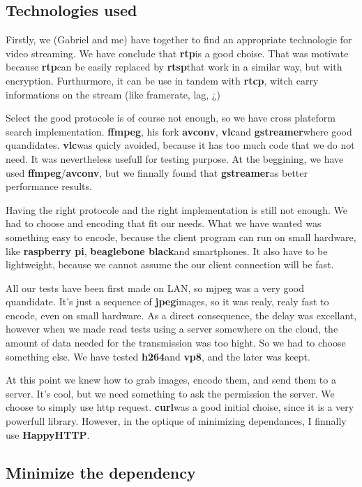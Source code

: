 \documentclass[a4paper,11pt]{custom}
\newcommand{\rtp}{\textbf{rtp}}
\newcommand{\rtcp}{\textbf{rtcp}}
\newcommand{\rtsp}{\textbf{rtsp}}
\newcommand{\vlc}{\textbf{vlc}}
\newcommand{\avconv}{\textbf{avconv}}
\newcommand{\ffmpeg}{\textbf{ffmpeg}}
\newcommand{\gstreamer}{\textbf{gstreamer}}
\newcommand{\curl}{\textbf{curl}}
\newcommand{\happyhttp}{\textbf{HappyHTTP}}
\newcommand{\jpeg}{\textbf{jpeg}}
\newcommand{\vpx}{\textbf{vp8}}
\newcommand{\mpeg}{\textbf{h264}}
\newcommand{\rpi}{\textbf{raspberry pi}}
\newcommand{\bbb}{\textbf{beaglebone black}}
\begin{document}
\subsection{Technologies used}

Firstly, we (Gabriel and me) have together to find an appropriate technologie
for video streaming. We have conclude that \rtp is a good choise. That was
motivate because \rtp can be easily replaced by \rtsp that work in a similar
way, but with encryption. Furthurmore, it can be use in tandem with \rtcp, witch
carry informations on the stream (like framerate, lag, ¿)

Select the good protocole is of course not enough, so we have cross plateform
search implementation. \ffmpeg, his fork \avconv, \vlc and \gstreamer where good
quandidates. \vlc was quicly avoided, because it has too much code that we do not
need. It was nevertheless usefull for testing purpose. At the beggining, we have
used \ffmpeg/\avconv, but we finnally found that \gstreamer as better performance
results.

Having the right protocole and the right implementation is still not enough. We
had to choose and encoding that fit our needs. What we have wanted was something
easy to encode, because the client program can run on small hardware, like \rpi,
\bbb and smartphones. It also have to be lightweight, because we cannot assume
the our client connection will be fast.

All our tests have been first made on LAN, so mjpeg was a very good quandidate.
It's just a sequence of \jpeg images, so it was realy, realy fast to encode,
even on small hardware. As a direct consequence, the delay was excellant,
however when we made read tests using a server somewhere on the cloud, the
amount of data needed for the transmission was too hight. So we had to choose
something else. We have tested \mpeg and \vpx, and the later was keept.

At this point we knew how to grab images, encode them, and send them to a
server. It's cool, but we need something to ask the permission the server. We
choose to simply use http request. \curl was a good initial choise, since it is
a very powerfull library. However, in the optique of minimizing dependances, I
finnally use \happyhttp.

\subsection{Minimize the dependency}
\end{document}
